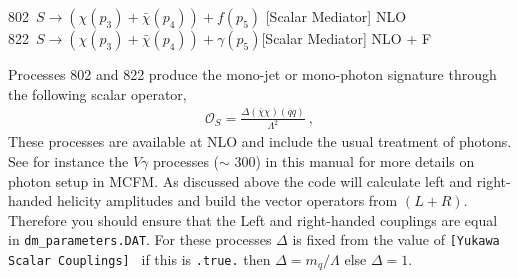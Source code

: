 802~$ S\to({\chi}(p_3)+\bar{\chi}(p_4)) +f(p_5)$ [Scalar Mediator]  NLO \\
822~$S\to({\chi}(p_3)+\bar{\chi}(p_4)) +\gamma(p_5) $[Scalar Mediator]  NLO + F 

Processes 802 and 822 produce the 
mono-jet or mono-photon signature through the following scalar operator, 
\begin{eqnarray}
\mathcal{O}_S=\frac{\Delta(\overline{\chi}\chi)(\overline{q}q)}{\Lambda^2}~,
\end{eqnarray}
These processes are available at NLO and include the usual treatment
of photons. See for instance the $V\gamma$ processes ($\sim$ 300) in
this manual for more details on photon setup in MCFM. As discussed
above the code will calculate left and right-handed helicity
amplitudes and build the vector operators from $(L+R)$. Therefore you
should ensure that the Left and right-handed couplings are equal in
{\tt dm\_parameters.DAT}. For these processes $\Delta$ is fixed from
the value of {\tt [Yukawa Scalar Couplings] } if this is {\tt .true.}
then $\Delta=m_q/\Lambda$ else $\Delta=1$.

